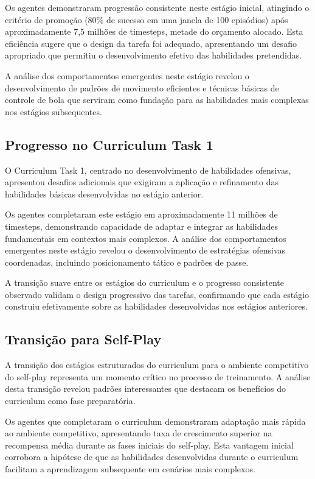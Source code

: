Os agentes demonstraram progressão consistente neste estágio inicial, atingindo o critério de promoção (80\% de sucesso em uma janela de 100 episódios) após aproximadamente 7,5 milhões de timesteps, metade do orçamento alocado. Esta eficiência sugere que o design da tarefa foi adequado, apresentando um desafio apropriado que permitiu o desenvolvimento efetivo das habilidades pretendidas.

A análise dos comportamentos emergentes neste estágio revelou o desenvolvimento de padrões de movimento eficientes e técnicas básicas de controle de bola que serviram como fundação para as habilidades mais complexas nos estágios subsequentes.

\subsection{Progresso no Curriculum Task 1}

O Curriculum Task 1, centrado no desenvolvimento de habilidades ofensivas, apresentou desafios adicionais que exigiram a aplicação e refinamento das habilidades básicas desenvolvidas no estágio anterior.

Os agentes completaram este estágio em aproximadamente 11 milhões de timesteps, demonstrando capacidade de adaptar e integrar as habilidades fundamentais em contextos mais complexos. A análise dos comportamentos emergentes neste estágio revelou o desenvolvimento de estratégias ofensivas coordenadas, incluindo posicionamento tático e padrões de passe.

A transição suave entre os estágios do curriculum e o progresso consistente observado validam o design progressivo das tarefas, confirmando que cada estágio construiu efetivamente sobre as habilidades desenvolvidas nos estágios anteriores.

\subsection{Transição para Self-Play}

A transição dos estágios estruturados do curriculum para o ambiente competitivo do self-play representa um momento crítico no processo de treinamento. A análise desta transição revelou padrões interessantes que destacam os benefícios do curriculum como fase preparatória.

Os agentes que completaram o curriculum demonstraram adaptação mais rápida ao ambiente competitivo, apresentando taxa de crescimento superior na recompensa média durante as fases iniciais do self-play. Esta vantagem inicial corrobora a hipótese de que as habilidades desenvolvidas durante o curriculum facilitam a aprendizagem subsequente em cenários mais complexos.

